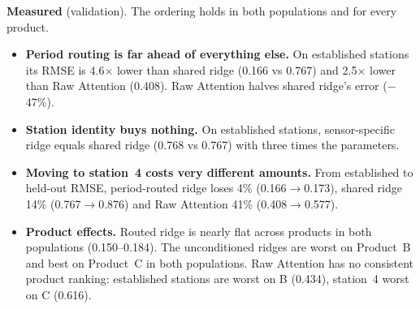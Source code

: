 \begin{table}[H]\centering\small
\caption{Output 1.1, validation. RMSE in \ms, MSE in \mss. Columns A, B and C give RMSE by product.}
\end{table}

\textbf{Measured} (validation). The ordering holds in both populations and for every product.
\begin{itemize}
  \item \textbf{Period routing is far ahead of everything else.} On established stations its RMSE is 4.6$\times$ lower than shared ridge (0.166 vs 0.767) and 2.5$\times$ lower than Raw Attention (0.408). Raw Attention halves shared ridge's error ($-$47\%).
  \item \textbf{Station identity buys nothing.} On established stations, sensor-specific ridge equals shared ridge (0.768 vs 0.767) with three times the parameters.
  \item \textbf{Moving to station~4 costs very different amounts.} From established to held-out RMSE, period-routed ridge loses 4\% (0.166$\to$0.173), shared ridge 14\% (0.767$\to$0.876) and Raw Attention 41\% (0.408$\to$0.577).
  \item \textbf{Product effects.} Routed ridge is nearly flat across products in both populations (0.150--0.184). The unconditioned ridges are worst on Product~B and best on Product~C in both populations. Raw Attention has no consistent product ranking: established stations are worst on B (0.434), station~4 worst on C (0.616).
\end{itemize}

